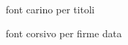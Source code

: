 \documentclass{article}
\begin{document}
    \begin{titlepage}
        \centering
        {\fontsize{60}{1}\selectfont{} font carino per titoli}
        \par\vspace{5cm}
        { \fontsize{50}{1}\selectfont font corsivo per firme}
        \vfill
        {\large{data}}
    \end{titlepage}
\end{document}
